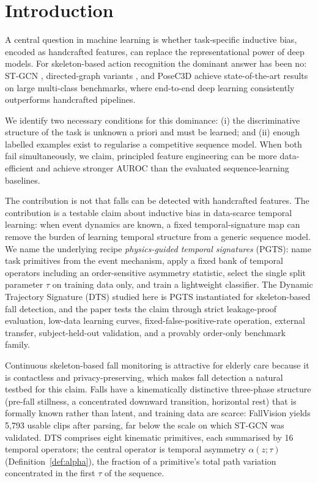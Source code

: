 \section{Introduction}
A central question in machine learning is whether task-specific inductive bias, encoded as handcrafted features, can replace the representational power of deep models. For skeleton-based action recognition the dominant answer has been no: ST-GCN \citep{yan2018stgcn}, directed-graph variants \citep{shi2019directed}, and PoseC3D \citep{duan2022posec3d} achieve state-of-the-art results on large multi-class benchmarks, where end-to-end deep learning consistently outperforms handcrafted pipelines.

We identify two necessary conditions for this dominance: (i) the discriminative structure of the task is unknown a priori and must be learned; and (ii) enough labelled examples exist to regularise a competitive sequence model. When both fail simultaneously, we claim, principled feature engineering can be more data-efficient and achieve stronger AUROC than the evaluated sequence-learning baselines.

The contribution is not that falls can be detected with handcrafted features. The contribution is a testable claim about inductive bias in data-scarce temporal learning: when event dynamics are known, a fixed temporal-signature map can remove the burden of learning temporal structure from a generic sequence model. We name the underlying recipe \emph{physics-guided temporal signatures} (PGTS): name task primitives from the event mechanism, apply a fixed bank of temporal operators including an order-sensitive asymmetry statistic, select the single split parameter $\tau$ on training data only, and train a lightweight classifier. The Dynamic Trajectory Signature (DTS) studied here is PGTS instantiated for skeleton-based fall detection, and the paper tests the claim through strict leakage-proof evaluation, low-data learning curves, fixed-false-positive-rate operation, external transfer, subject-held-out validation, and a provably order-only benchmark family.

Continuous skeleton-based fall monitoring is attractive for elderly care because it is contactless and privacy-preserving, which makes fall detection a natural testbed for this claim. Falls have a kinematically distinctive three-phase structure (pre-fall stillness, a concentrated downward transition, horizontal rest) that is formally known rather than latent, and training data are scarce: FallVision \citep{fallvision2024} yields 5,793 usable clips after parsing, far below the scale on which ST-GCN was validated. DTS comprises eight kinematic primitives, each summarised by 16 temporal operators; the central operator is temporal asymmetry $\alpha(z;\tau)$ (Definition~\ref{def:alpha}), the fraction of a primitive's total path variation concentrated in the first $\tau$ of the sequence.

